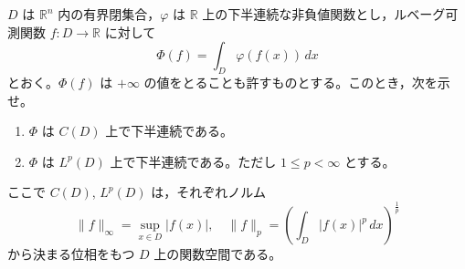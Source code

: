 \documentclass[12pt]{jlreq}
\newcommand{\R}{\mathbb{R}}
\begin{document}
$D$ は $\R^n$ 内の有界閉集合，$\varphi$ は $\R$ 上の下半連続な非負値関数とし，ルベーグ可測関数 $f : D \to \R$ に対して
\[
  \Phi(f) = \int_D \varphi(f(x)) \, dx
\]
とおく。$\Phi(f)$ は $+\infty$ の値をとることも許すものとする。このとき，次を示せ。

\begin{enumerate}
  \item $\Phi$ は $C(D)$ 上で下半連続である。
  \item $\Phi$ は $L^p(D)$ 上で下半連続である。ただし $1 \le p < \infty$ とする。
\end{enumerate}
ここで $C(D)$, $L^p(D)$ は，それぞれノルム
\[
  \|f\|_\infty = \sup_{x \in D} |f(x)|,\quad \|f\|_p = \left( \int_D |f(x)|^p \, dx \right)^{\frac{1}{p}}
\]
から決まる位相をもつ $D$ 上の関数空間である。
\end{document}

